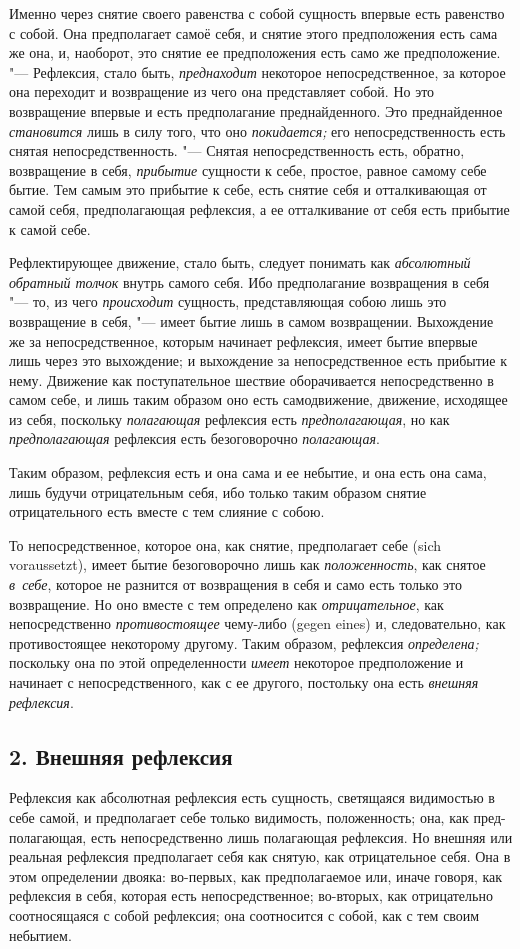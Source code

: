 Именно через снятие своего равенства с собой сущность впервые есть равенство
с собой. Она предполагает самоё себя, и снятие этого предположения есть
сама же она, и, наоборот, это снятие ее предположения есть само же
предположение. "--- Рефлексия, стало быть,
{\em преднаходит} некоторое непосредственное, за
которое она переходит и возвращение из чего она представляет собой. Но это
возвращение впервые и есть предполагание преднайденного. Это преднайденное
{\em становится} лишь в силу того, что оно
{\em покидается;} его непосредственность есть снятая
непосредственность. "--- Снятая непосредственность есть, обратно, возвращение
в себя, {\em прибытие} сущности к себе, простое, равное
самому себе бытие. Тем самым это прибытие к себе, есть снятие себя и
отталкивающая от самой себя, предполагающая рефлексия, а ее отталкивание от
себя есть прибытие к самой себе.

Рефлектирующее движение, стало быть, следует понимать как
{\em абсолютный обратный толчок} внутрь самого себя.
Ибо предполагание возвращения в себя "--- то, из чего
{\em происходит} сущность, представляющая собою лишь
это возвращение в себя, "--- имеет бытие лишь в самом возвращении. Выхождение
же за непосредственное, которым начинает рефлексия, имеет бытие впервые
лишь через это выхождение; и выхождение за непосредственное есть прибытие к
нему. Движение как поступательное шествие оборачивается непосредственно в
самом себе, и лишь таким образом оно есть самодвижение, движение, исходящее
из себя, поскольку {\em полагающая} рефлексия есть
{\em предполагающая}, но как
{\em предполагающая} рефлексия есть безоговорочно
{\em полагающая}.

Таким образом, рефлексия есть и она сама и ее небытие, и она есть она сама,
лишь будучи отрицательным себя, ибо только таким образом снятие
отрицательного есть вместе с тем слияние с собою.

То непосредственное, которое она, как снятие, предполагает себе (sich
voraussetzt), имеет бытие безоговорочно лишь как
{\em положенность}, как снятое
{\em в~себе}, которое не разнится от возвращения в себя
и само есть только это возвращение. Но оно вместе с тем определено как
{\em отрицательное}, как непосредственно
{\em противостоящее} чему-либо (gegen eines) и,
следовательно, как противостоящее некоторому другому. Таким образом,
рефлексия {\em определена;} поскольку она по этой
определенности {\em имеет} некоторое предположение и
начинает с непосредственного, как с ее другого, постольку она есть
{\em внешняя рефлексия}.

\subsection[2. Внешняя рефлексия]{2. Внешняя рефлексия}
Рефлексия как абсолютная рефлексия есть
сущность, светящаяся видимостью в себе самой, и предполагает себе только
видимость, положенность; она, как пред-полагающая, есть непосредственно
лишь полагающая рефлексия. Но внешняя или реальная рефлексия предполагает
себя как снятую, как отрицательное себя. Она в этом определении двояка:
во-первых, как предполагаемое или, иначе говоря, как рефлексия в себя,
которая есть непосредственное; во-вторых, как отрицательно соотносящаяся с
собой рефлексия; она соотносится с собой, как с тем своим небытием.

